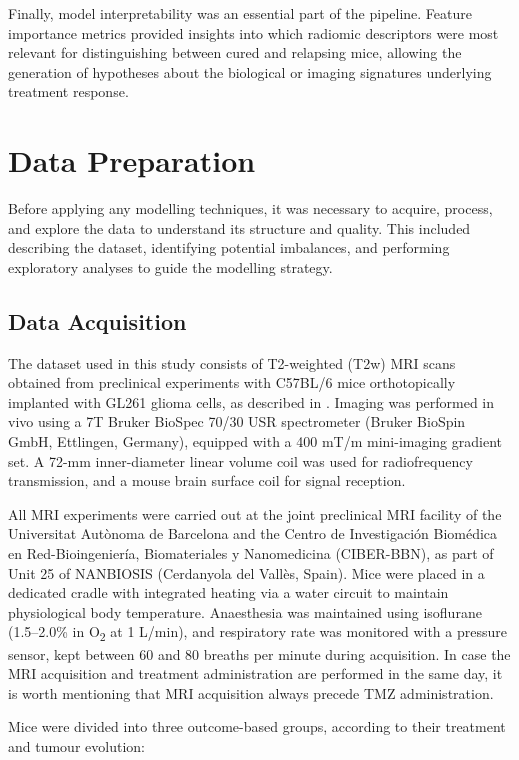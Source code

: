 \documentclass[12pt, a4paper]{report}
\begin{document}
Finally, model interpretability was an essential part of the pipeline. Feature importance metrics provided insights into which radiomic descriptors were most relevant for distinguishing between cured and relapsing mice, allowing the generation of hypotheses about the biological or imaging signatures underlying treatment response.

\section{Data Preparation}

Before applying any modelling techniques, it was necessary to acquire, process, and explore the data to understand its structure and quality. This included describing the dataset, identifying potential imbalances, and performing exploratory analyses to guide the modelling strategy.

\subsection{Data Acquisition}

The dataset used in this study consists of T2-weighted (T2w) MRI scans obtained from preclinical experiments with C57BL/6 mice orthotopically implanted with GL261 glioma cells, as described in \cite{Wu2020}. Imaging was performed in vivo using a 7T Bruker BioSpec 70/30 USR spectrometer (Bruker BioSpin GmbH, Ettlingen, Germany), equipped with a 400 mT/m mini-imaging gradient set. A 72-mm inner-diameter linear volume coil was used for radiofrequency transmission, and a mouse brain surface coil for signal reception.

All MRI experiments were carried out at the joint preclinical MRI facility of the Universitat Autònoma de Barcelona and the Centro de Investigación Biomédica en Red-Bioingeniería, Biomateriales y Nanomedicina (CIBER-BBN), as part of Unit 25 of NANBIOSIS (Cerdanyola del Vallès, Spain). Mice were placed in a dedicated cradle with integrated heating via a water circuit to maintain physiological body temperature. Anaesthesia was maintained using isoflurane (1.5–2.0\% in O\textsubscript{2} at 1 L/min), and respiratory rate was monitored with a pressure sensor, kept between 60 and 80 breaths per minute during acquisition. In case the MRI acquisition and treatment administration are performed in the same day, it is worth mentioning that MRI acquisition always precede TMZ administration.

Mice were divided into three outcome-based groups, according to their treatment and tumour evolution:
\end{document}
